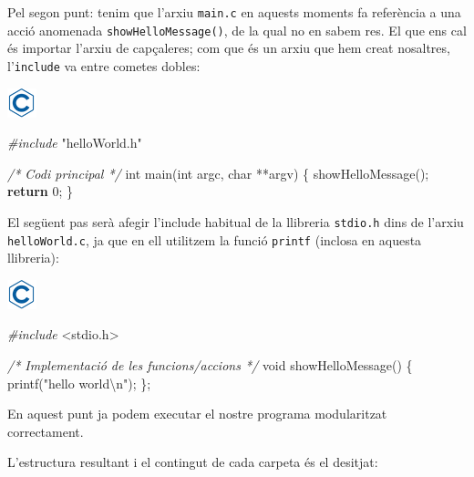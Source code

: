 \documentclass[]{book}
\newenvironment{Shaded}{\begin{snugshade}}{\end{snugshade}}
\newcommand{\CommentTok}[1]{\textcolor[rgb]{0.56,0.35,0.01}{\textit{#1}}}
\newcommand{\ControlFlowTok}[1]{\textcolor[rgb]{0.13,0.29,0.53}{\textbf{#1}}}
\newcommand{\DataTypeTok}[1]{\textcolor[rgb]{0.13,0.29,0.53}{#1}}
\newcommand{\DecValTok}[1]{\textcolor[rgb]{0.00,0.00,0.81}{#1}}
\newcommand{\ImportTok}[1]{#1}
\newcommand{\NormalTok}[1]{#1}
\newcommand{\PreprocessorTok}[1]{\textcolor[rgb]{0.56,0.35,0.01}{\textit{#1}}}
\newcommand{\SpecialCharTok}[1]{\textcolor[rgb]{0.00,0.00,0.00}{#1}}
\newcommand{\StringTok}[1]{\textcolor[rgb]{0.31,0.60,0.02}{#1}}
\begin{document}
Pel segon punt: tenim que l'arxiu \texttt{main.c} en aquests moments fa referència a una acció anomenada \texttt{showHelloMessage()}, de la qual no en sabem res. El que ens cal és importar l'arxiu de capçaleres; com que és un arxiu que hem creat nosaltres, l'\texttt{include} va entre cometes dobles:

\includegraphics{./img/c.png}

\begin{Shaded}
\begin{Highlighting}[]
\PreprocessorTok{\#include }\ImportTok{"helloWorld.h"}

\CommentTok{/* Codi principal */}
\DataTypeTok{int}\NormalTok{ main(}\DataTypeTok{int}\NormalTok{ argc, }\DataTypeTok{char}\NormalTok{ **argv) \{}
\NormalTok{    showHelloMessage();}
    \ControlFlowTok{return} \DecValTok{0}\NormalTok{;}
\NormalTok{\}}
\end{Highlighting}
\end{Shaded}

El següent pas serà afegir l'include habitual de la llibreria \texttt{stdio.h} dins de l'arxiu \texttt{helloWorld.c}, ja que en ell utilitzem la funció \texttt{printf} (inclosa en aquesta llibreria):

\includegraphics{./img/c.png}

\begin{Shaded}
\begin{Highlighting}[]
\PreprocessorTok{\#include }\ImportTok{\textless{}stdio.h\textgreater{}}

\CommentTok{/* Implementació de les funcions/accions */}
\DataTypeTok{void}\NormalTok{ showHelloMessage() \{}
\NormalTok{    printf(}\StringTok{"hello world}\SpecialCharTok{\textbackslash{}n}\StringTok{"}\NormalTok{);}
\NormalTok{\};}
\end{Highlighting}
\end{Shaded}

En aquest punt ja podem executar el nostre programa modularitzat correctament.

L'estructura resultant i el contingut de cada carpeta és el desitjat:
\end{document}
